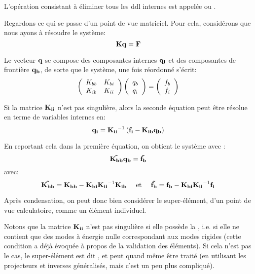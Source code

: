 L'opération consistant à éliminer tous les ddl internes est appelée 
 ou .

\medskip
Regardons ce qui se passe d'un point de vue matriciel.
Pour cela, considérons que nous ayons à résoudre le système:
\begin{equation}  \mathbf{K} \mathbf{q}=\mathbf{F}\end{equation}

Le vecteur $\mathbf{q}$ se compose des composantes internes $\mathbf{q_i}$ et des composantes
de frontière $\mathbf{q_b}$, de sorte que le système, une fois réordonné s'écrit:
\begin{equation}
\left( 
\begin{array}{cc}
K_{bb} & K_{bi}\\
K_{ib} & K_{ii}
\end{array}
\right)
\left( 
\begin{array}{c}
q_b\\q_i
\end{array}
\right)
=
\left( 
\begin{array}{c}
f_b\\f_i
\end{array}
\right)
\end{equation}

Si la matrice $\mathbf{K_{ii}}$ n'est pas singulière, alors la seconde équation peut être
résolue en terme de variables internes en:
\begin{equation}
\mathbf{q_i} = \mathbf{K_{ii}}^{-1}\left(\mathbf{f_i}-\mathbf{K_{ib}}\mathbf{q_b}\right)
\end{equation}

En reportant cela dans la première équation, on obtient le système avec :
\begin{equation}
\mathbf{\tilde{K_{bb}}}\mathbf{q_b} = \mathbf{\tilde{f_b}}
\end{equation}
avec:
\begin{equation}
\mathbf{\tilde{K_{bb}}}=\mathbf{K_{bb}} - \mathbf{K_{bi}}\mathbf{K_{ii}}^{-1}\mathbf{K_{ib}} 
\quad \text{ et }\quad 
\mathbf{\tilde{f_b}}=\mathbf{f_b} - \mathbf{K_{bi}}\mathbf{K_{ii}}^{-1}\mathbf{f_i}
\end{equation}

Après condensation, on peut donc bien considérer le super-élément, d'un point de vue calculatoire,
comme un élément individuel.

\medskip
Notons que la matrice $\mathbf{K_{ii}}$ n'est pas singulière si elle possède la , i.e. si elle ne contient que des modes à énergie nulle correspondant aux 
modes rigides (cette condition a déjà évoquée à propos de la validation des éléments).
Si cela n'est pas le cas, le super-élément est dit , et
peut quand même être traité (en utilisant les projecteurs et inverses généralisés,
mais c'est un peu plus compliqué).

